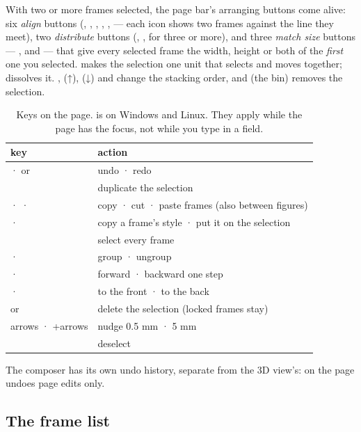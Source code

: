With two or more frames selected, the page bar's arranging buttons come alive: six \emph{align} buttons (, , , , ,  — each icon shows two frames against the line they meet), two \emph{distribute} buttons (, , for three or more), and three \emph{match size} buttons — ,  and  — that give every selected frame the width, height or both of the \emph{first} one you selected.  makes the selection one unit that selects and moves together;  dissolves it. ,  (↑),  (↓) and  change the stacking order, and  (the bin) removes the selection.

\begin{table}[htbp]\small
\begin{tabularx}{\linewidth}{@{}lL@{}}\toprule
key & action \\ \midrule
{} ·  or  & undo · redo \\
 & duplicate the selection \\
 ·  ·  & copy · cut · paste frames (also between figures) \\
 ·  & copy a frame's style · put it on the selection \\
 & select every frame \\
 ·  & group · ungroup \\
\key{⌘]} · \key{⌘[} & forward · backward one step \\
\key{⌘⇧]} · \key{⌘⇧[} & to the front · to the back \\
 or  & delete the selection (locked frames stay) \\
arrows · +arrows & nudge 0.5 mm · 5 mm \\
 & deselect \\ \bottomrule
\end{tabularx}
\caption{Keys on the page.  is  on Windows and Linux. They apply while the page has the focus, not while you type in a field.}\label{tab:compo-keys}
\end{table}

The composer has its own undo history, separate from the 3D view's:  on the page undoes page edits only.

\subsection{The frame list}

